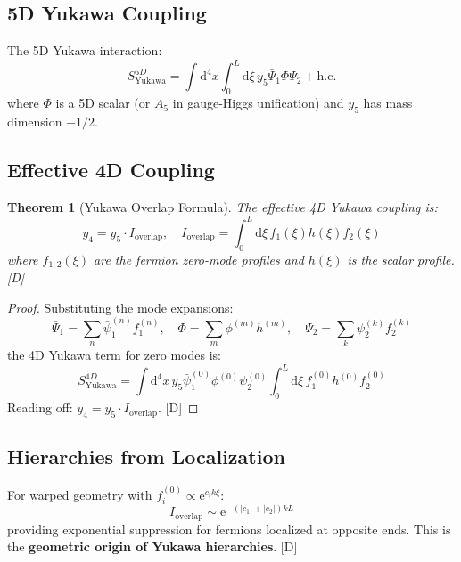 \documentclass[11pt,a4paper]{article}
\newtheorem{theorem}{Theorem}[section]
\newcommand{\dd}{\mathrm{d}}
\newcommand{\ee}{\mathrm{e}}
\begin{document}
\subsection{5D Yukawa Coupling}

The 5D Yukawa interaction:
\begin{equation}
S_{\text{Yukawa}}^{5D} = \int \dd^4x \int_0^L \dd\xi\, y_5 \bar{\Psi}_1 \Phi \Psi_2 + \text{h.c.}
\label{eq:5d-yukawa}
\end{equation}
where $\Phi$ is a 5D scalar (or $A_5$ in gauge-Higgs unification) and $y_5$ has mass dimension $-1/2$.

\subsection{Effective 4D Coupling}

\begin{theorem}[Yukawa Overlap Formula]
\label{thm:yukawa-overlap}
The effective 4D Yukawa coupling is:
\begin{equation}
\boxed{
y_4 = y_5 \cdot I_{\text{overlap}}, \quad
I_{\text{overlap}} = \int_0^L \dd\xi\, f_1(\xi) h(\xi) f_2(\xi)
}
\label{eq:yukawa-overlap}
\end{equation}
where $f_{1,2}(\xi)$ are the fermion zero-mode profiles and $h(\xi)$ is the scalar profile. [D]
\end{theorem}

\begin{proof}
Substituting the mode expansions:
\begin{equation}
\bar{\Psi}_1 = \sum_n \bar{\psi}_1^{(n)} f_1^{(n)}, \quad
\Phi = \sum_m \phi^{(m)} h^{(m)}, \quad
\Psi_2 = \sum_k \psi_2^{(k)} f_2^{(k)}
\label{eq:mode-subs}
\end{equation}
the 4D Yukawa term for zero modes is:
\begin{equation}
S_{\text{Yukawa}}^{4D} = \int \dd^4x\, y_5 \bar{\psi}_1^{(0)} \phi^{(0)} \psi_2^{(0)}
\int_0^L \dd\xi\, f_1^{(0)} h^{(0)} f_2^{(0)}
\label{eq:4d-yukawa-deriv}
\end{equation}
Reading off: $y_4 = y_5 \cdot I_{\text{overlap}}$. [D]
\end{proof}

\subsection{Hierarchies from Localization}

For warped geometry with $f_i^{(0)} \propto \ee^{c_i k \xi}$:
\begin{equation}
I_{\text{overlap}} \sim \ee^{-(|c_1| + |c_2|)kL}
\label{eq:overlap-hierarchy}
\end{equation}
providing exponential suppression for fermions localized at opposite ends. This is the
\textbf{geometric origin of Yukawa hierarchies}. [D]
\end{document}
